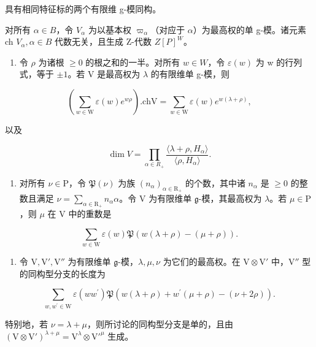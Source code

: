 具有相同特征标的两个有限维 g-模同构。

对所有 \(\alpha\in B\)，令 \(V_{\alpha}\) 为以基本权 \(\varpi_{\alpha}\)（对应于 \(\alpha\)）为最高权的单 g-模。诸元素 ch \(V_{\alpha},\alpha\in B\) 代数无关，且生成 Z-代数 \(Z[P]^{W}\)。

\begin{enumerate}
\def\labelenumi{\arabic{enumi})}
\setcounter{enumi}{25}
\tightlist
\item
  令 \(\rho\) 为诸根 \(\geq 0\) 的根之和的一半。对所有 \(w \in W\)，令 \(\varepsilon(w)\) 为 w 的行列式，等于 \(\pm 1\)。若 V 是最高权为 \(\lambda\) 的有限维单 g-模，则
\end{enumerate}

\[
\left(\sum_ {w \in \mathrm{W}} \varepsilon (w) e ^ {w \rho}\right). \mathrm{chV} = \sum_ {w \in \mathrm{W}} \varepsilon (w) e ^ {w (\lambda + \rho)},
\]

以及

\[
\dim V = \prod_ {\alpha \in R _ {+}} \frac {\langle \lambda + \rho , H _ {\alpha} \rangle}{\langle \rho , H _ {\alpha} \rangle}.
\]

\begin{enumerate}
\def\labelenumi{\arabic{enumi})}
\setcounter{enumi}{26}
\tightlist
\item
  对所有 \(\nu \in \mathrm{P}\)，令 \(\mathfrak{P}(\nu)\) 为族 \((n_{\alpha})_{\alpha \in \mathrm{R}_{+}}\) 的个数，其中诸 \(n_{\alpha}\) 是 \(\geq 0\) 的整数且满足 \(\nu = \sum_{\alpha \in \mathrm{R}_{+}} n_{\alpha} \alpha\)。令 \(\mathrm{V}\) 为有限维单 \(\mathfrak{g}\)-模，其最高权为 \(\lambda\)。若 \(\mu \in \mathrm{P}\)，则 \(\mu\) 在 \(\mathrm{V}\) 中的重数是
\end{enumerate}

\[
\sum_ {w \in \mathrm{W}} \varepsilon (w) \mathfrak {P} (w (\lambda + \rho) - (\mu + \rho)).
\]

\begin{enumerate}
\def\labelenumi{\arabic{enumi})}
\setcounter{enumi}{27}
\tightlist
\item
  令 \(\mathrm{V}, \mathrm{V}', \mathrm{V}''\) 为有限维单 \(\mathfrak{g}\)-模，\(\lambda, \mu, \nu\) 为它们的最高权。在 \(\mathrm{V} \otimes \mathrm{V}'\) 中，\(\mathrm{V}''\) 型的同构型分支的长度为
\end{enumerate}

\[
\sum_ {w, w ^ {\prime} \in \mathrm{W}} \varepsilon (w w ^ {\prime}) \mathfrak {P} (w (\lambda + \rho) + w ^ {\prime} (\mu + \rho) - (\nu + 2 \rho)).
\]

特别地，若 \(\nu = \lambda + \mu\)，则所讨论的同构型分支是单的，且由 \((\mathrm{V} \otimes \mathrm{V}')^{\lambda + \mu} = \mathrm{V}^{\lambda} \otimes \mathrm{V}'^{\mu}\) 生成。


